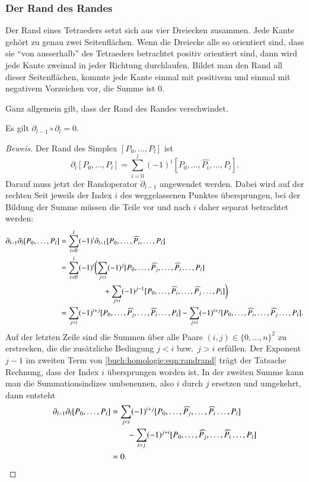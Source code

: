 \subsubsection{Der Rand des Randes}
Der Rand eines Tetraeders setzt sich aus vier Dreiecken
zusammen.
Jede Kante gehört zu genau zwei Seitenflächen. 
Wenn die Dreiecke alle so orientiert sind, dass sie ``von ausserhalb''
des Tetraeders betrachtet positiv orientiert sind, dann wird jede
Kante zweimal in jeder Richtung durchlaufen.
Bildet man den Rand all dieser Seitenflächen, kommte jede Kante
einmal mit positivem und einmal mit negativem Vorzeichen vor,
die Summe ist $0$.

Ganz allgemein gilt, dass der Rand des Randes verschwindet.

\begin{satz}
\label{buch:homologie:satz:randrand}
Es gilt $\partial_{l-1}\circ\partial_l=0$.
\end{satz}

\begin{proof}[Beweis]
Der Rand des Simplex $[P_0,\dots,P_l]$ ist
\[
\partial_l[P_0,\dots,P_l]
=
\sum_{i=0}^l (-1)^i [P_0,\dots,\widehat{P_i},\dots,P_l].
\]
Darauf muss jetzt der Randoperator $\partial_{l-1}$ angewendet
werden.
Dabei wird auf der rechten Seit jeweils der Index $i$ des weggelassenen
Punktes übersprungen, bei der Bildung der
Summe müssen die Teile vor und nach $i$ daher separat betrachtet werden:
\begin{align}
\partial_{l-1}\partial_l[P_0,\dots,P_l]
&=
\sum_{i=0}^l (-1)^i \partial_{l-1}[P_0,\dots,\widehat{P_i},\dots,P_l]
\notag
\\
&=
\sum_{i=0}^l (-1)^i
\biggl(
\sum_{j<i} (-1)^j
[P_0,\dots,\widehat{P_j},\dots,\widehat{P_i}\dots,P_l]
\notag
\\
&\hspace*{2cm}
+
\sum_{j>i} (-1)^{j-1}
[P_0,\dots,\widehat{P_i},\dots,\widehat{P_j}\dots,P_l]
\biggr)
\label{buch:homologie:eqn:randrand}
\\
&=
\sum_{j<i} (-1)^{i+j}
[P_0,\dots,\widehat{P_j},\dots,\widehat{P_i}\dots,P_l]
-
\sum_{j>i} (-1)^{i+j}
[P_0,\dots,\widehat{P_i},\dots,\widehat{P_j}\dots,P_l].
\notag
\end{align}
Auf der letzten Zeile sind die Summen über alle Paare
$(i,j)\in\{0,\dots,n\}^2$ zu erstrecken, die die zusätzliche
Bedingung $j<i$ bzw.~$j>i$ erfüllen.
Der Exponent $j-1$ im zweiten Term von
\eqref{buch:homologie:eqn:randrand}
trägt der Tatsache Rechnung,
dass der Index $i$ übersprungen worden ist.
In der zweiten Summe kann man die Summationsindizes umbenennen,
also $i$ durch $j$ ersetzen und umgekehrt, dann entsteht
\begin{align*}
\partial_{l-1}\partial_l[P_0,\dots,P_l]
&=
\sum_{j<i} (-1)^{i+j}
[P_0,\dots,\widehat{P_j},\dots,\widehat{P_i}\dots,P_l]
\\
&\qquad
-
\sum_{i>j} (-1)^{j+i}
[P_0,\dots,\widehat{P_j},\dots,\widehat{P_i}\dots,P_l]
\\
&=0.
\qedhere
\end{align*}
\end{proof}

